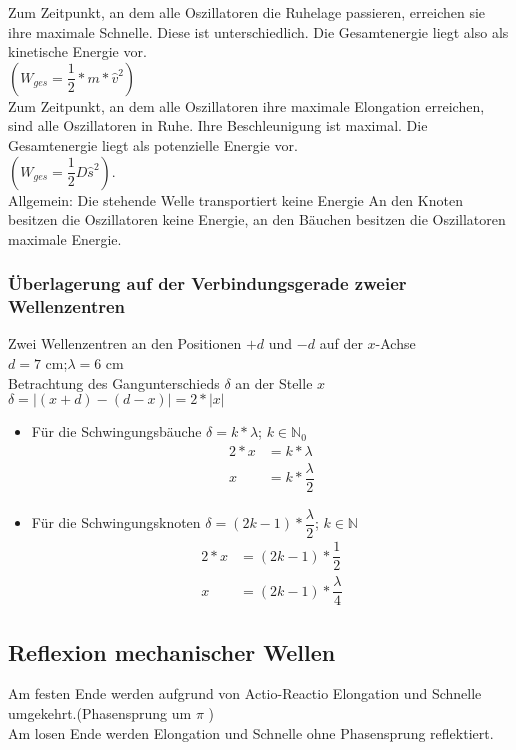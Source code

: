 \documentclass[12 pt]{article}
\numberwithin{equation}{section}
\begin{document}
	
	Zum Zeitpunkt, an dem alle Oszillatoren die Ruhelage passieren, erreichen sie ihre maximale Schnelle. Diese ist unterschiedlich. Die Gesamtenergie liegt also als kinetische Energie vor.\\$(W_{ges}=\dfrac{1}{2}*m*\hat{v}^2)$\\
	Zum Zeitpunkt, an dem alle Oszillatoren ihre maximale Elongation erreichen, sind alle Oszillatoren in Ruhe. Ihre Beschleunigung ist maximal.
	Die Gesamtenergie liegt als potenzielle Energie vor.\\$(W_{ges} =\dfrac{1}{2}D\hat{s}^2)$.\\
	Allgemein: Die stehende Welle transportiert keine Energie
	An den Knoten besitzen die Oszillatoren keine Energie, an den Bäuchen besitzen die Oszillatoren maximale Energie.
	\subsubsection*{Überlagerung auf der Verbindungsgerade zweier Wellenzentren}
	Zwei Wellenzentren an den Positionen $+d$ und $-d$ auf der $x$-Achse\\
	$d=7$ cm;\hspace{10mm}$\lambda=6$ cm\\
	Betrachtung des Gangunterschieds $\delta$ an der Stelle $x$\\
	$\delta=\left|(x+d)-(d-x)\right|=2*|x|$\\
	\begin{itemize}
		\item Für die Schwingungsbäuche $\delta=k*\lambda$; $k \in \mathbb{N}_0$
		\begin{align*}
			2*x&=k*\lambda\\
			x&=k*\dfrac{\lambda}{2}
		\end{align*}
		\item Für die Schwingungsknoten $\delta=(2k-1)*\dfrac{\lambda}{2}$; $k \in \mathbb{N}$
		\begin{align*}
			2*x&=(2k-1)*\dfrac{1}{2}\\
			x&=(2k-1)*\dfrac{\lambda}{4}
		\end{align*}
	\end{itemize}
	\subsection{Reflexion mechanischer Wellen}
	Am festen Ende werden aufgrund von Actio-Reactio Elongation und Schnelle umgekehrt.(Phasensprung um $\pi$ )\\
	Am losen Ende werden Elongation und Schnelle ohne Phasensprung reflektiert.
	
\end{document}
